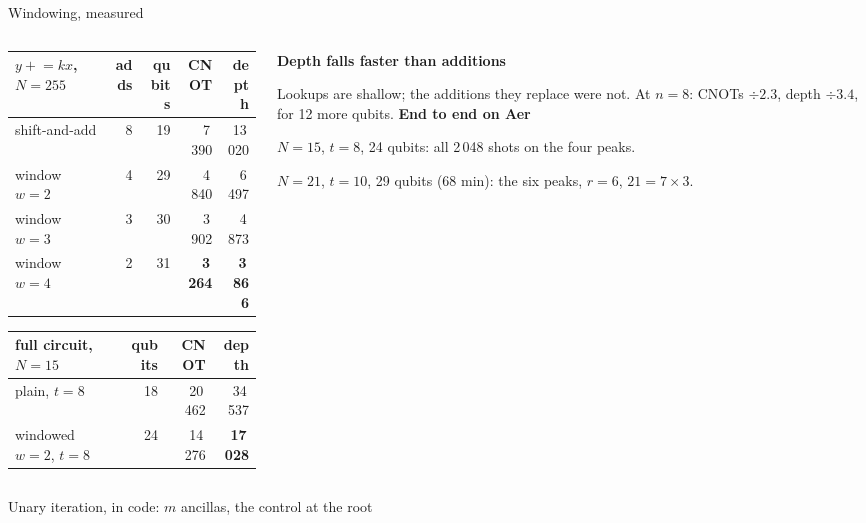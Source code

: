 \documentclass[aspectratio=169,11pt]{beamer}
\newcommand{\blocktitle}[1]{{\bfseries #1}\par\vskip1mm}
\newcommand{\code}[2][]{}
\begin{document}
\setcounter{framenumber}{55}
\begin{frame}{Windowing, measured}
  \begin{columns}[T]
    \begin{column}{0.55\textwidth}
      \centering\footnotesize
      \renewcommand{\arraystretch}{1.08}
      \begin{tabular}{@{}lrrrr@{}}
        \toprule
        $y\mathrel{+}=kx$, $N=255$ & adds & qubits & CNOT & depth \\
        \midrule
        shift-and-add & 8 & 19 & 7\,390 & 13\,020 \\
        window $w=2$ & 4 & 29 & 4\,840 & 6\,497 \\
        window $w=3$ & 3 & 30 & 3\,902 & 4\,873 \\
        window $w=4$ & 2 & 31 & \textbf{3\,264} & \textbf{3\,866} \\
        \bottomrule
      \end{tabular}\par
      \vskip3mm
      \begin{tabular}{@{}lrrr@{}}
        \toprule
        full circuit, $N=15$ & qubits & CNOT & depth \\
        \midrule
        plain, $t=8$ & 18 & 20\,462 & 34\,537 \\
        windowed $w=2$, $t=8$ & 24 & 14\,276 & \textbf{17\,028} \\
        \bottomrule
      \end{tabular}
    \end{column}
    \begin{column}{0.41\textwidth}
      \small
      \blocktitle{Depth falls faster than additions}
      Lookups are shallow; the additions they replace were not. At $n=8$: CNOTs $\div2.3$, depth $\div3.4$, for 12 more qubits.
      \vskip1.5mm
      \blocktitle{End to end on Aer}
      $N=15$, $t=8$, 24 qubits: all 2\,048 shots on the four peaks.\par
      $N=21$, $t=10$, 29 qubits (68 min): the six peaks, $r=6$, $21=7\times3$.
    \end{column}
  \end{columns}
\end{frame}

\setcounter{framenumber}{57}
\begin{frame}[fragile]{Unary iteration, in code: $m$ ancillas, the control at the root}
  \code[basicstyle=\ttfamily\fontsize{7.6}{8.8}\selectfont]{lookup_ui.py}
\end{frame}
\end{document}
